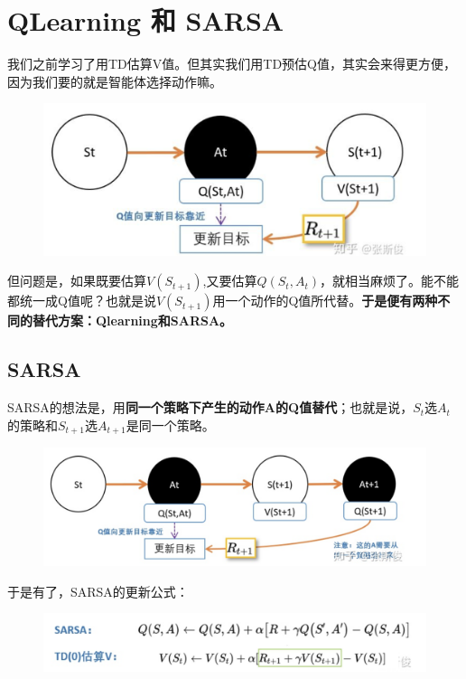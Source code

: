 \documentclass[12pt]{article}
\begin{document}
\section{QLearning 和 SARSA}
我们之前学习了用TD估算V值。但其实我们用TD预估Q值，其实会来得更方便，因为我们要的就是智能体选择动作嘛。
\begin{figure}[H]
    \centering
    \includegraphics[width=.8\textwidth]{fig/ReinforcementLearning/RL_TD_For_Q.png}
\end{figure}

但问题是，如果既要估算$V(S_{t+1})$,又要估算$Q(S_t,A_t)$，就相当麻烦了。能不能都统一成Q值呢？也就是说$V(S_{t+1})$用一个动作的Q值所代替。\textbf{于是便有两种不同的替代方案：Qlearning和SARSA。}

\subsection{SARSA}
SARSA的想法是，用\textbf{同一个策略下产生的动作A的Q值替代}；也就是说，$S_t$选$A_t$的策略和$S_{t+1}$选$A_{t+1}$是同一个策略。
\begin{figure}[H]
    \centering
    \includegraphics[width=.8\textwidth]{fig/ReinforcementLearning/RL_SARSA_Update_V.png}
\end{figure}

于是有了，SARSA的更新公式：
\begin{figure}[H]
    \centering
    \includegraphics[width=.8\textwidth]{fig/ReinforcementLearning/RL_SARSA_Update_V_Eq.png}
\end{figure}
\end{document}
